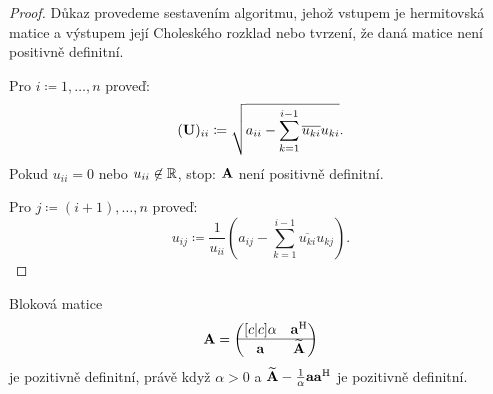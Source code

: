 \begin{proof}
    Důkaz provedeme sestavením algoritmu, jehož vstupem je hermitovská 
    matice a výstupem její Choleského rozklad nebo tvrzení, že 
    daná matice není positivně definitní.

    Pro $i \coloneqq 1, \dots, n$ proveď:
    $$(\mathbf{U})_{ii} \coloneqq \sqrt{a_{ii} - \sum_{k=1}^{i-1}
    \overline{u_{ki}}u_{ki}}.$$
    Pokud $u_{ii} = 0$ nebo $u_{ii} \not \in \mathbb{R}$, stop: $\mathbf{A}$ není positivně
    definitní.

    Pro $j \coloneqq (i+1), \dots, n$ proveď:
    $$u_{ij} \coloneqq \frac{1}{u_{ii}} (a_{ij} - \sum_{k=1}^{i-1} 
    \overline{u_{ki}}u_{kj}).$$
\end{proof}

\begin{proposition}
    Bloková matice 
    $$\mathbf{A} = \begin{pmatrix}[c|c]
        \alpha &\mathbf{a}^{\mathrm{H}} \\
        \hline
        \mathbf{a} &\mathbf{\widetilde{A}}
    \end{pmatrix}$$
    je pozitivně definitní, právě když $\alpha > 0$ a $\mathbf{\widetilde{A}} - 
    \frac{1}{\alpha}\mathbf{a}\mathbf{a}^{\mathrm{H}}$ je pozitivně definitní.
\end{proposition}

